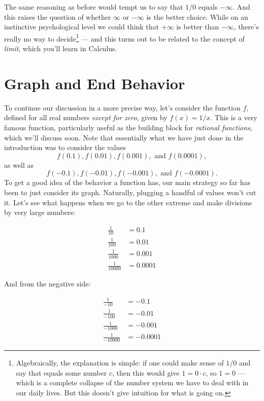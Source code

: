 \documentclass{ximera}
\begin{document}
The same reasoning as before would tempt us to say that $1/0$ equals $-\infty$. And this raises the question of whether $\infty$ or $-\infty$ is the better choice. While on an instinctive psychological level we could think that $+\infty$ is better than $-\infty$, there's really no way to decide\footnote{Algebraically, the explanation is simple: if one could make sense of $1/0$ and say that equals some number $c$, then this would give $1 = 0 \cdot c$, so $1 = 0$ --- which is a complete collapse of the number system we have to deal with in our daily lives. But this doesn't give intuition for what is going on.} --- and this turns out to be related to the concept of \emph{limit}, which you'll learn in Calculus.

\section{Graph and End Behavior}

To continue our discussion in a more precise way, let's consider the function $f$, defined for all real numbers \emph{except for zero}, given by $f(x) = 1/x$. This is a very famous function, particularly useful as the building block for \emph{rational functions}, which we'll discuss soon. Note that essentially what we have just done in the introduction was to consider the values $$   f(0.1), f(0.01), f(0.001), \mbox{ and } f(0.0001),$$as well as $$f(-0.1), f(-0.01), f(-0.001), \mbox{ and } f(-0.0001).  $$
To get a good idea of the behavior a function has, our main strategy so far has been to just consider its graph. Naturally, plugging a handful of values won't cut it. Let's see what happens when we go to the other extreme and make divisions by very large numbers:

\begin{align*}
  \frac{1}{10} &= 0.1 \\ \frac{1}{100} &= 0.01 \\ \frac{1}{1000} &= 0.001 \\ \frac{1}{10000} &= 0.0001
\end{align*}

And from the negative side:

\begin{align*}
  \frac{1}{-10} &= -0.1 \\ \frac{1}{-100} &= -0.01 \\ \frac{1}{-1000} &= -0.001 \\ \frac{1}{-10000} &= -0.0001
\end{align*}
\end{document}
